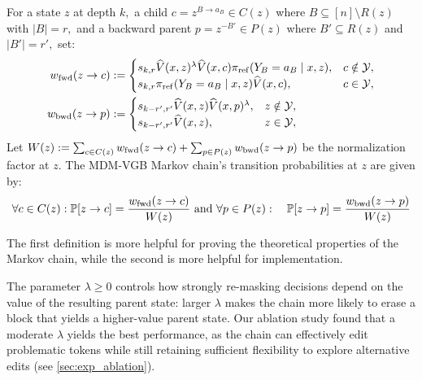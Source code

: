 \documentclass{article}
\numberwithin{theorem}{section}
\numberwithin{proposition}{section}
\numberwithin{corollary}{section}
\numberwithin{lemma}{section}
\numberwithin{conjecture}{section}
\numberwithin{remark}{section}
\numberwithin{definition}{section}
\numberwithin{assumption}{section}
\numberwithin{example}{section}
\newcommand{\calY}{{\mathcal{Y}}}
\providecommand{\base}{\pi_{\mathrm{ref}}}
\begin{document}
\begin{definition}\label{def:main_geometric_balanced_mdm}
For a state $z$ at depth $k,$ a child \(c=z^{B\rightarrow a_B}\in C(z)\) where \(B \subseteq [n] \setminus R(z)\) with $|B|= r,$ and a backward parent $p = z^{-B'}\in P(z)$ where $B'\subseteq R(z)$ and $|B'|=r',$ set:
\begin{equation*}
\begin{aligned}
    w_{\rm fwd}(z\to c)
    &:=
    \begin{cases}
    s_{k,r}\widehat V(x,z)^\lambda
    \widehat V(x,c)\base(Y_B=a_B\mid x,z), & c\notin\calY,\\
    s_{k,r}\base(Y_B=a_B\mid x,z)\widehat{V}(x,c), & c\in\calY,
    \end{cases}\\
    w_{\rm bwd}(z\to p)
    &:=
    \begin{cases}
    s_{k-r',r'}\widehat V(x,z)\widehat V(x,p)^\lambda, & z\notin\calY,\\
    s_{k-r',r'}\widehat{V}(x,z), & z\in\calY,
    \end{cases}
\end{aligned}
\end{equation*}
Let $
    W(z):= \sum_{c\in C(z)} w_{\rm fwd}(z\to c) + \sum_{p\in P(z)} w_{\rm bwd} (z\to p) $  be the normalization factor at $z$. The MDM-VGB Markov chain's transition probabilities at $z$ are given by:
\begin{align*}
  \forall c\in C(z): \mathbb{P}[z \to c] = \frac{ w_{\rm fwd}(z\to c)}{W(z)} \text{ and  } \forall p\in P(z): \quad \mathbb{P}[z \to p] = \frac{ w_{\rm bwd}(z\to p)}{W(z)}
\end{align*}
\end{definition}

The first definition is more helpful for proving the theoretical properties of the Markov chain, while the second is more helpful for implementation.
\begin{remark} \label{remark:parameter lambda}
The parameter \(\lambda\ge 0\) controls how strongly re-masking decisions depend on the value of the resulting parent state: larger \(\lambda\) makes the chain more likely to erase a block that yields a higher-value parent state. Our ablation study found that a moderate $\lambda$ yields the best performance, as the chain can effectively edit problematic tokens while still retaining sufficient flexibility to explore alternative edits (see \cref{sec:exp_ablation}).
\end{remark}
\end{document}
